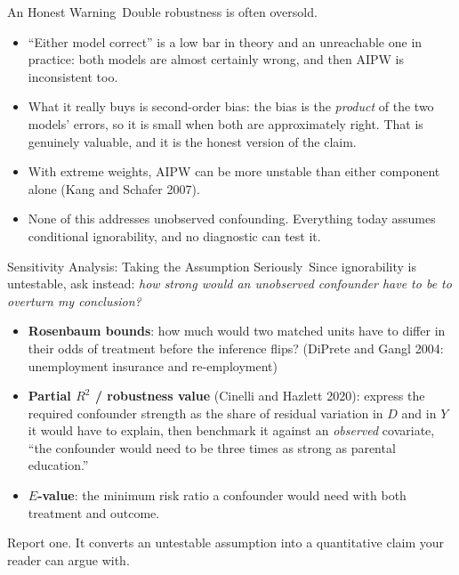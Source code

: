 \documentclass[aspectratio=169,11pt,xcolor=dvipsnames]{beamer}
\newcommand{\srcp}[1]{{\scriptsize\color{gray}(#1)}}
\newcommand{\core}{\,\raisebox{0.6pt}{\textcolor{corestar}{$\bigstar$}}}
\begin{document}
\begin{frame}{An Honest Warning\core}
Double robustness is often oversold.
\vskip3pt
\begin{itemize}\itemsep2pt
  \item ``Either model correct'' is a low bar in theory and an unreachable one in
        practice: both models are almost certainly wrong, and then AIPW is
        inconsistent too.
  \item What it really buys is \alert{second-order bias}: the bias is the
        \emph{product} of the two models' errors, so it is small when both are
        approximately right. That is genuinely valuable, and it is the honest
        version of the claim.
  \item With extreme weights, AIPW can be more unstable than either component
        alone \srcp{Kang and Schafer 2007}.
  \item \alert{None of this addresses unobserved confounding.} Everything today
        assumes conditional ignorability, and no diagnostic can test it.
\end{itemize}
\end{frame}

\begin{frame}{Sensitivity Analysis: Taking the Assumption Seriously\core}
Since ignorability is untestable, ask instead: \emph{how strong would an
unobserved confounder have to be to overturn my conclusion?}
\vskip3pt
\begin{itemize}\itemsep3pt
  \item \textbf{Rosenbaum bounds}: how much would two matched units have to
        differ in their odds of treatment before the inference flips?
        \srcp{DiPrete and Gangl 2004: unemployment insurance and re-employment}
  \item \textbf{Partial $R^2$ / robustness value} \srcp{Cinelli and Hazlett 2020}:
        express the required confounder strength as the share of residual
        variation in $D$ and in $Y$ it would have to explain, then benchmark it
        against an \emph{observed} covariate, ``the confounder would need to
        be three times as strong as parental education.''
  \item \textbf{$E$-value}: the minimum risk ratio a confounder would need with
        both treatment and outcome.
\end{itemize}
\vskip3pt
\alert{Report one.} It converts an untestable assumption into a quantitative
claim your reader can argue with.
\end{frame}
\end{document}
